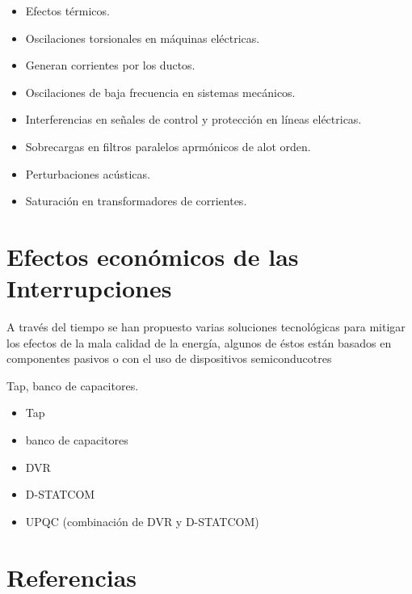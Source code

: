 \documentclass[]{article}
\begin{document}
\begin{itemize}
	\item Efectos térmicos.
	\item Oscilaciones torsionales en máquinas eléctricas.
	\item Generan corrientes por los ductos.
	\item Oscilaciones de baja frecuencia en sistemas mecánicos.
	\item Interferencias en señales de control y protección en líneas eléctricas.
	 \item Sobrecargas en filtros paralelos aprmónicos de alot orden.
	 \item Perturbaciones acústicas.
	 \item Saturación en transformadores de corrientes.
\end{itemize}


\section{Efectos económicos de las Interrupciones}

A través del tiempo se han propuesto varias soluciones tecnológicas para mitigar los efectos de la mala calidad de la energía, algunos de éstos están basados en componentes pasivos o con el uso de dispositivos semiconducotres

Tap, banco de capacitores.



\begin{itemize}
	\item Tap
	\item banco de capacitores
	\item DVR
	\item D-STATCOM
	\item UPQC (combinación de DVR y D-STATCOM)
\end{itemize}



\section{Referencias}

%
%



\begin{thebibliography}{9}
	
	
	
	
	
\end{thebibliography}
\end{document}

